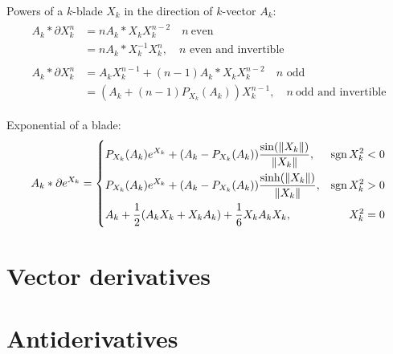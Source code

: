 \documentclass[a4paper,12pt]{article}
\begin{document}
Powers of a $k$-blade $X_k$ in the direction of $k$-vector $A_k$:
\begin{align}
\label{eq:evenbladedif}
\begin{split}
A_k * \partial X_k^n &= n A_k *X_k X_k^{n - 2} \quad n\ \mathrm{even}\\
&= n A_k * X_k^{-1} X_k^{n},\quad n \textrm{ even and invertible}
\end{split}\\
\label{eq:oddbladedif}
\begin{split}
A_k * \partial X_k^n &= A_k X_k^{n-1} + (n-1) A_k*X_k X_k^{n-2}
\quad n \textrm{ odd}\\
&= \left(A_k + (n-1) P_{X_k}(A_k)\right) X_k^{n-1},\quad n\ \textrm{odd and invertible}
\end{split}
\end{align}

Exponential of a blade:
\begin{equation}
\label{eq:bladeexpdif}
A_k *\partial e^{X_k} = \left\{\begin{aligned}
&P_{X_k}(A_k) e^{X_k} + (A_k - P_{X_k}(A_k)) \frac{\sin(\left\lVert X_k\right\rVert)}{\left\lVert X_k\right\rVert}, &\operatorname{sgn}{X_k^2} < 0&\\
&P_{X_k}(A_k) e^{X_k} + (A_k - P_{X_k}(A_k)) \frac{\sinh(\left\lVert X_k\right\rVert)}{\left\lVert X_k\right\rVert}, &\operatorname{sgn}{X_k^2} > 0&\\
&A_k + \frac{1}{2}(A_k X_k + X_k A_k) + \frac{1}{6}X_k A_k X_k, &X_k^2 = 0&
\end{aligned} \right.
\end{equation}

\section{Vector derivatives}

\section{Antiderivatives}


\printbibliography[heading=bibintoc, title={References}]
\end{document}

